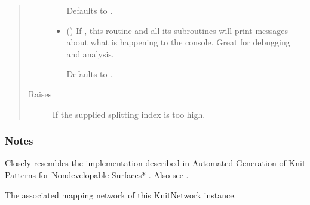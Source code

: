 \documentclass[letterpaper,10pt,english]{sphinxmanual}
\begin{document}
\begin{fulllineitems}
\begin{fulllineitems}
\begin{quote}
\begin{description}
\begin{itemize}
Defaults to .


\item {} 
 (\sphinxstyleliteralemphasis{\sphinxupquote{, }}) \textendash{} 
If , this routine and all its subroutines will print
messages about what is happening to the console. Great for debugging
and analysis.

Defaults to .


\end{itemize}

\item[{Raises}] \leavevmode
{\hyperref[\detokenize{cockatoo:cockatoo.exception.KnitNetworkError}]{}} \textendash{} If the supplied splitting index is too high.

\end{description}\end{quote}
\subsubsection*{Notes}

Closely resembles the implementation described in Automated Generation
of Knit Patterns for Non\sphinxhyphen{}developable Surfaces* \sphinxfootnotemark[1]. Also see  \sphinxfootnotemark[2].

\end{fulllineitems}


\begin{fulllineitems}
\label{\detokenize{cockatoo:cockatoo.KnitNetwork.mapping_network}}
The associated mapping network of this                                KnitNetwork instance.

\end{fulllineitems}



\end{fulllineitems}
\end{document}
